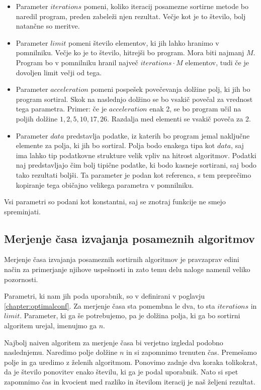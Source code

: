 \documentclass[a4paper,oneside]{article}
\begin{document}
\begin{itemize}
  \item Parameter $iterations$ pomeni, koliko iteracij posamezne sortirne metode bo naredil
    program, preden zabeleži njen rezultat. Večje kot je to število, bolj natančne so
    meritve.
  \item Parameter $limit$ pomeni število elementov, ki jih lahko hranimo v pomnilniku.
    Večje ko je to število, hitrejši bo program. Mora biti najmanj $M$. Program bo v
    pomnilniku hranil največ $iterations \cdot M$ elementov, tudi če je dovoljen limit večji od
    tega.
  \item Parameter $acceleration$ pomeni pospešek povečevanja dolžine polj, ki jih bo
    program sortiral. Skok na naslednjo dolžino se bo vsakič povečal za vrednost tega
    parametra. Primer: če je $acceleration$ enak 2, se bo program učil na poljih dolžine
    $1, 2, 5, 10, 17, 26$. Razdalja med elementi se vsakič poveča za 2.
  \item Parameter $data$ predstavlja podatke, iz katerih bo program jemal naključne
    elemente za polja, ki jih bo sortiral. Polja bodo enakega tipa kot $data$, saj ima
    lahko tip podatkovne strukture velik vpliv na hitrost algoritmov. Podatki naj
    predstavljajo čim bolj tipične podatke, ki bodo kasneje sortirani, saj bodo tako
    rezultati boljši. Ta parameter je podan kot referenca, s tem preprečimo kopiranje
    tega običajno velikega parametra v pomnilniku.
\end{itemize}
Vsi parametri so podani kot konstantni, saj se znotraj funkcije ne smejo spreminjati. 

\subsection{Merjenje časa izvajanja posameznih algoritmov}
Merjenje časa izvajanja posameznih sortirnih algoritmov je pravzaprav edini način za
primerjanje njihove uspešnosti in zato temu delu naloge namenil veliko pozornosti.

Parametri, ki nam jih poda uporabnik, so v definirani v poglavju
\ref{chapter:optimalconf}. Za merjenje časa sta pomembna le dva, to sta $iterations$ in
$limit$. Parameter, ki ga še potrebujemo, pa je dolžina polja, ki ga bo sortirni algoritem
urejal, imenujmo ga $n$.

Najbolj naiven algoritem za merjenje časa bi verjetno izgledal podobno naslednjemu. 
Naredimo polje dolžine $n$ in si zapomnimo trenuten čas. Premešamo polje in ga
uredimo z želenih algoritmom. Ponovimo zadnje dva koraka tolikokrat, da je število
ponovitev enako številu, ki ga je podal uporabnik. Nato si spet zapomnimo čas in kvocient
med razliko in številom iteracij je naš željeni rezultat.
\end{document}
